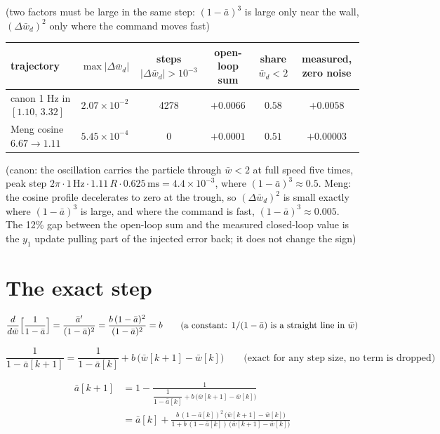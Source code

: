 \documentclass[11pt,a4paper,fontset=none]{ctexart}
\newcommand{\ba}{\bar{a}}
\newcommand{\bw}{\bar{w}}
\begin{document}
(two factors must be large in the same step: $(1-\ba)^{3}$ is large only near
the wall, $(\Delta\bw_d)^{2}$ only where the command moves fast)

\begin{center}\footnotesize\setlength{\tabcolsep}{4pt}
\begin{tabular}{lccccc}
trajectory & $\max|\Delta\bw_d|$ & steps $|\Delta\bw_d| > 10^{-3}$
  & open-loop sum & share $\bw_d < 2$ & measured, zero noise \\
\hline
canon 1 Hz in $[1.10,\,3.32]$ & $2.07\times10^{-2}$ & 4278 & $+0.0066$ & $0.58$ & $+0.0058$ \\
Meng cosine $6.67 \to 1.11$   & $5.45\times10^{-4}$ & 0    & $+0.0001$ & $0.51$ & $+0.00003$
\end{tabular}
\end{center}

(canon: the oscillation carries the particle through $\bw < 2$ at full speed
five times, peak step $2\pi\cdot 1\,\mathrm{Hz}\cdot 1.11\,R\cdot 0.625\,\mathrm{ms}
= 4.4\times10^{-3}$, where $(1-\ba)^{3} \approx 0.5$. Meng: the cosine profile
decelerates to zero at the trough, so $(\Delta\bw_d)^{2}$ is small exactly where
$(1-\ba)^{3}$ is large, and where the command is fast, $(1-\ba)^{3} \approx 0.005$.
The 12\% gap between the open-loop sum and the measured closed-loop value is the
$y_1$ update pulling part of the injected error back; it does not change the sign)

\section{The exact step}

\begin{equation*}
\frac{d}{d\bw}\Bigl[\frac{1}{1-\ba}\Bigr]
  = \frac{\ba'}{(1-\ba)^{2}}
  = \frac{b\,(1-\ba)^{2}}{(1-\ba)^{2}}
  = b
\qquad\text{(a constant: } 1/(1-\ba) \text{ is a straight line in } \bw\text{)}
\end{equation*}

\begin{equation*}
\frac{1}{1-\ba[k+1]} = \frac{1}{1-\ba[k]} + b\,\bigl(\bw[k+1]-\bw[k]\bigr)
\qquad\text{(exact for any step size, no term is dropped)}
\end{equation*}

\begin{align*}
\ba[k+1] &= 1 - \frac{1}{\dfrac{1}{1-\ba[k]} + b\,\bigl(\bw[k+1]-\bw[k]\bigr)} \\
         &= \ba[k]
  + \frac{b\,(1-\ba[k])^{2}\,\bigl(\bw[k+1]-\bw[k]\bigr)}
         {1 + b\,(1-\ba[k])\,\bigl(\bw[k+1]-\bw[k]\bigr)}
\end{align*}
\end{document}
